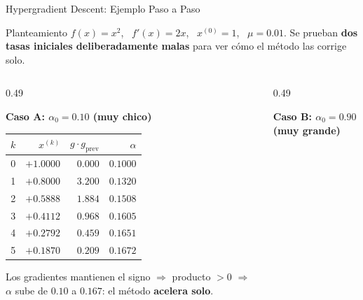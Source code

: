 \begin{frame}{Hypergradient Descent: Ejemplo Paso a Paso}
    \begin{exampleblock}{Planteamiento}
        \scriptsize
        $f(x)=x^{2}$, \ $f'(x)=2x$, \ $x^{(0)}=1$, \ $\mu=0.01$.
        Se prueban \textbf{dos tasas iniciales deliberadamente malas} para ver cómo el
        método las corrige solo.
    \end{exampleblock}

    \vspace{-0.2em}
    \begin{columns}[T]
        \begin{column}{0.49\textwidth}
            \begin{center}
            \tiny
            \textcolor{VerdeNeon}{\textbf{Caso A: $\alpha_0=0.10$ (muy chico)}}\\[0.2em]
            \begin{tabular}{c r r r}
                \toprule
                $k$ & $x^{(k)}$ & $g\cdot g_{\text{prev}}$ & $\alpha$ \\
                \midrule
                0 & $+1.0000$ & $0.000$ & $0.1000$ \\
                1 & $+0.8000$ & $3.200$ & $0.1320$ \\
                2 & $+0.5888$ & $1.884$ & $0.1508$ \\
                3 & $+0.4112$ & $0.968$ & $0.1605$ \\
                4 & $+0.2792$ & $0.459$ & $0.1651$ \\
                5 & $+0.1870$ & $0.209$ & $0.1672$ \\
                \bottomrule
            \end{tabular}
            \end{center}
            \vspace{0.2em}
            \tiny
            Los gradientes mantienen el signo $\Rightarrow$ producto $>0$
            $\Rightarrow$ $\alpha$ sube de $0.10$ a $0.167$: el método
            \textbf{acelera solo}.
        \end{column}
        \begin{column}{0.49\textwidth}
            \begin{center}
            \tiny
            \textcolor{RojoAlerta}{\textbf{Caso B: $\alpha_0=0.90$ (muy grande)}}\\[0.2em]

\end{center}
\end{column}
\end{columns}
\end{frame}
